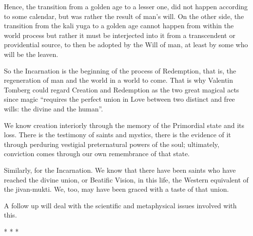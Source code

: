 Hence, the transition from a golden age to a lesser one, did not happen according to some calendar, but was rather the
result of man's will. On the other side, the transition from the kali yuga to a golden age cannot
happen from within the world process but rather it must be interjected into it from a transcendent or providential
source, to then be adopted by the Will of man, at least by some who will be the leaven.

So the Incarnation is the beginning of the process of Redemption, that is, the regeneration of man and the world in a
world to come. That is why Valentin Tomberg could regard Creation and Redemption as the two great magical acts since
magic “requires the perfect union in Love between two distinct and free wills: the divine and the human”.

We know creation interiorly through the memory of the Primordial state and its loss. There is the testimony of saints
and mystics, there is the evidence of it through perduring vestigial preternatural powers of the soul; ultimately,
conviction comes through our own remembrance of that state.

Similarly, for the Incarnation. We know that there have been saints who have reached the divine union, or Beatific
Vision, in this life, the Western equivalent of the jivan-mukti. We, too, may have been graced with a taste of that
union.

A follow up will deal with the scientific and metaphysical issues involved with this.


\begin{center}* * *\end{center}

